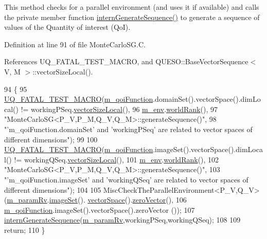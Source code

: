 This method checks for a parallel environment (and uses it if available) and calls the private member function \hyperlink{class_q_u_e_s_o_1_1_monte_carlo_s_g_ad0a5e608dd814fbc17237a267c6d5827}{intern\-Generate\-Sequence()} to generate a sequence of values of the Quantity of interest (Qo\-I). 

Definition at line 91 of file Monte\-Carlo\-S\-G.\-C.



References U\-Q\-\_\-\-F\-A\-T\-A\-L\-\_\-\-T\-E\-S\-T\-\_\-\-M\-A\-C\-R\-O, and Q\-U\-E\-S\-O\-::\-Base\-Vector\-Sequence$<$ V, M $>$\-::vector\-Size\-Local().


\begin{DoxyCode}
94 \{
95   \hyperlink{_defines_8h_a56d63d18d0a6d45757de47fcc06f574d}{UQ\_FATAL\_TEST\_MACRO}(\hyperlink{class_q_u_e_s_o_1_1_monte_carlo_s_g_ae0c3b848d58b4f79d5e3741e70fbcd78}{m\_qoiFunction}.domainSet().vectorSpace().dimLocal() !=
       workingPSeq.\hyperlink{class_q_u_e_s_o_1_1_base_vector_sequence_a2fefedf9e5b90f22881103b3f92555f6}{vectorSizeLocal}(),
96                       \hyperlink{class_q_u_e_s_o_1_1_monte_carlo_s_g_a30055a359b22cde54681679aed8ae6e7}{m\_env}.\hyperlink{class_q_u_e_s_o_1_1_base_environment_a78b57112bbd0e6dd0e8afec00b40ffa7}{worldRank}(),
97                       \textcolor{stringliteral}{"MonteCarloSG<P\_V,P\_M,Q\_V,Q\_M>::generateSequence()"},
98                       \textcolor{stringliteral}{"'m\_qoiFunction.domainSet' and 'workingPSeq' are related to vector spaces of
       different dimensions"});
99 
100   \hyperlink{_defines_8h_a56d63d18d0a6d45757de47fcc06f574d}{UQ\_FATAL\_TEST\_MACRO}(\hyperlink{class_q_u_e_s_o_1_1_monte_carlo_s_g_ae0c3b848d58b4f79d5e3741e70fbcd78}{m\_qoiFunction}.imageSet().vectorSpace().dimLocal() != 
      workingQSeq.\hyperlink{class_q_u_e_s_o_1_1_base_vector_sequence_a2fefedf9e5b90f22881103b3f92555f6}{vectorSizeLocal}(),
101                       \hyperlink{class_q_u_e_s_o_1_1_monte_carlo_s_g_a30055a359b22cde54681679aed8ae6e7}{m\_env}.\hyperlink{class_q_u_e_s_o_1_1_base_environment_a78b57112bbd0e6dd0e8afec00b40ffa7}{worldRank}(),
102                       \textcolor{stringliteral}{"MonteCarloSG<P\_V,P\_M,Q\_V,Q\_M>::generateSequence()"},
103                       \textcolor{stringliteral}{"'m\_qoiFunction.imageSet' and 'workingQSeq' are related to vector spaces of different
       dimensions"});
104 
105   MiscCheckTheParallelEnvironment<P\_V,Q\_V>(\hyperlink{class_q_u_e_s_o_1_1_monte_carlo_s_g_a938acc7072543d727fe35fa0f5d9013f}{m\_paramRv}.\hyperlink{class_q_u_e_s_o_1_1_base_vector_r_v_aa4dd2f036228eac1f945bacc7147a922}{imageSet}().
      \hyperlink{class_q_u_e_s_o_1_1_vector_set_a923421590baf5bf93cf066e528f927dc}{vectorSpace}().\hyperlink{class_q_u_e_s_o_1_1_vector_space_a92e963bb5cab3eecd290dfe4b8f03b04}{zeroVector}(),
106                                              \hyperlink{class_q_u_e_s_o_1_1_monte_carlo_s_g_ae0c3b848d58b4f79d5e3741e70fbcd78}{m\_qoiFunction}.imageSet().vectorSpace().zeroVector
      ());
107   \hyperlink{class_q_u_e_s_o_1_1_monte_carlo_s_g_ad0a5e608dd814fbc17237a267c6d5827}{internGenerateSequence}(\hyperlink{class_q_u_e_s_o_1_1_monte_carlo_s_g_a938acc7072543d727fe35fa0f5d9013f}{m\_paramRv},workingPSeq,workingQSeq);
108 
109   \textcolor{keywordflow}{return};
110 \}
\end{DoxyCode}
